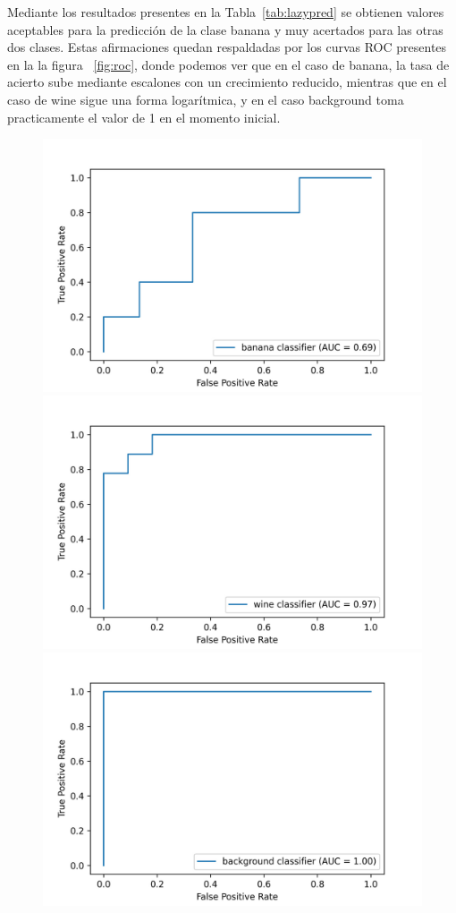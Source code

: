 \documentclass{esannV2}
\begin{document}
Mediante los resultados presentes en la Tabla~\ref{tab:lazypred} se obtienen valores aceptables para la predicción de la clase banana y muy acertados para las otras dos clases. Estas afirmaciones quedan respaldadas por los curvas ROC presentes en la la figura ~\ref{fig:roc}, donde podemos ver que en el caso de banana, la tasa de acierto sube mediante escalones con un crecimiento reducido, mientras que en el caso de wine sigue una forma logarítmica, y en el caso background toma practicamente el valor de 1 en el momento inicial. \\

\begin{figure}[b!]
\centering
\includegraphics[scale=0.3]{img/banana.png}
\includegraphics[scale=0.3]{img/wine.png}
\includegraphics[scale=0.3]{img/background.png}

\end{figure}
\end{document}
